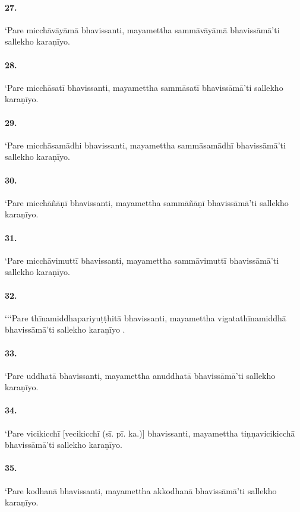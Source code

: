 \paragraph{27.} ‘Pare micchāvāyāmā bhavissanti, mayamettha sammāvāyāmā bhavissāmā’ti sallekho karaṇīyo.

\paragraph{28.} ‘Pare micchāsatī bhavissanti, mayamettha sammāsatī bhavissāmā’ti sallekho karaṇīyo.

\paragraph{29.} ‘Pare micchāsamādhi bhavissanti, mayamettha sammāsamādhī bhavissāmā’ti sallekho karaṇīyo.

\paragraph{30.} ‘Pare micchāñāṇī bhavissanti, mayamettha sammāñāṇī bhavissāmā’ti sallekho karaṇīyo.

\paragraph{31.} ‘Pare micchāvimuttī bhavissanti, mayamettha sammāvimuttī bhavissāmā’ti sallekho karaṇīyo.

\paragraph{32.} ‘‘‘Pare thīnamiddhapariyuṭṭhitā bhavissanti, mayamettha vigatathīnamiddhā bhavissāmā’ti sallekho karaṇīyo .

\paragraph{33.} ‘Pare uddhatā bhavissanti, mayamettha anuddhatā bhavissāmā’ti sallekho karaṇīyo.

\paragraph{34.} ‘Pare vicikicchī [vecikicchī (sī. pī. ka.)] bhavissanti, mayamettha tiṇṇavicikicchā bhavissāmā’ti sallekho karaṇīyo.

\paragraph{35.} ‘Pare kodhanā bhavissanti, mayamettha akkodhanā bhavissāmā’ti sallekho karaṇīyo.

